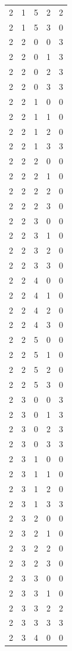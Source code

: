 \begin{longtable}{rrrrr}
2 & 1 & 5 & 2 & 2 \\
2 & 1 & 5 & 3 & 0 \\
2 & 2 & 0 & 0 & 3 \\
2 & 2 & 0 & 1 & 3 \\
2 & 2 & 0 & 2 & 3 \\
2 & 2 & 0 & 3 & 3 \\
2 & 2 & 1 & 0 & 0 \\
2 & 2 & 1 & 1 & 0 \\
2 & 2 & 1 & 2 & 0 \\
2 & 2 & 1 & 3 & 3 \\
2 & 2 & 2 & 0 & 0 \\
2 & 2 & 2 & 1 & 0 \\
2 & 2 & 2 & 2 & 0 \\
2 & 2 & 2 & 3 & 0 \\
2 & 2 & 3 & 0 & 0 \\
2 & 2 & 3 & 1 & 0 \\
2 & 2 & 3 & 2 & 0 \\
2 & 2 & 3 & 3 & 0 \\
2 & 2 & 4 & 0 & 0 \\
2 & 2 & 4 & 1 & 0 \\
2 & 2 & 4 & 2 & 0 \\
2 & 2 & 4 & 3 & 0 \\
2 & 2 & 5 & 0 & 0 \\
2 & 2 & 5 & 1 & 0 \\
2 & 2 & 5 & 2 & 0 \\
2 & 2 & 5 & 3 & 0 \\
2 & 3 & 0 & 0 & 3 \\
2 & 3 & 0 & 1 & 3 \\
2 & 3 & 0 & 2 & 3 \\
2 & 3 & 0 & 3 & 3 \\
2 & 3 & 1 & 0 & 0 \\
2 & 3 & 1 & 1 & 0 \\
2 & 3 & 1 & 2 & 0 \\
2 & 3 & 1 & 3 & 3 \\
2 & 3 & 2 & 0 & 0 \\
2 & 3 & 2 & 1 & 0 \\
2 & 3 & 2 & 2 & 0 \\
2 & 3 & 2 & 3 & 0 \\
2 & 3 & 3 & 0 & 0 \\
2 & 3 & 3 & 1 & 0 \\
2 & 3 & 3 & 2 & 2 \\
2 & 3 & 3 & 3 & 3 \\
2 & 3 & 4 & 0 & 0 \\

\end{longtable}
